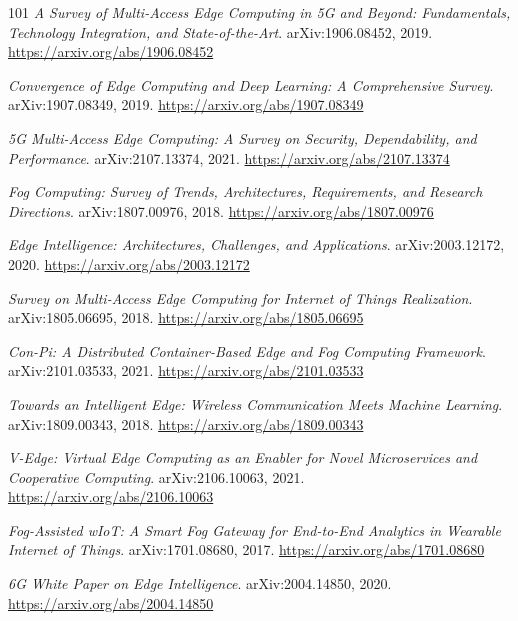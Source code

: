\documentclass[11pt,a4paper]{article}
\begin{document}
\begin{thebibliography}{101}
\newblock \emph{A Survey of Multi-Access Edge Computing in 5G and Beyond: Fundamentals, Technology Integration, and State-of-the-Art}.
\newblock arXiv:1906.08452, 2019.
\newblock \url{https://arxiv.org/abs/1906.08452}

\newblock \emph{Convergence of Edge Computing and Deep Learning: A Comprehensive Survey}.
\newblock arXiv:1907.08349, 2019.
\newblock \url{https://arxiv.org/abs/1907.08349}

\newblock \emph{5G Multi-Access Edge Computing: A Survey on Security, Dependability, and Performance}.
\newblock arXiv:2107.13374, 2021.
\newblock \url{https://arxiv.org/abs/2107.13374}

\newblock \emph{Fog Computing: Survey of Trends, Architectures, Requirements, and Research Directions}.
\newblock arXiv:1807.00976, 2018.
\newblock \url{https://arxiv.org/abs/1807.00976}

\newblock \emph{Edge Intelligence: Architectures, Challenges, and Applications}.
\newblock arXiv:2003.12172, 2020.
\newblock \url{https://arxiv.org/abs/2003.12172}

\newblock \emph{Survey on Multi-Access Edge Computing for Internet of Things Realization}.
\newblock arXiv:1805.06695, 2018.
\newblock \url{https://arxiv.org/abs/1805.06695}

\newblock \emph{Con-Pi: A Distributed Container-Based Edge and Fog Computing Framework}.
\newblock arXiv:2101.03533, 2021.
\newblock \url{https://arxiv.org/abs/2101.03533}

\newblock \emph{Towards an Intelligent Edge: Wireless Communication Meets Machine Learning}.
\newblock arXiv:1809.00343, 2018.
\newblock \url{https://arxiv.org/abs/1809.00343}

\newblock \emph{V-Edge: Virtual Edge Computing as an Enabler for Novel Microservices and Cooperative Computing}.
\newblock arXiv:2106.10063, 2021.
\newblock \url{https://arxiv.org/abs/2106.10063}

\newblock \emph{Fog-Assisted wIoT: A Smart Fog Gateway for End-to-End Analytics in Wearable Internet of Things}.
\newblock arXiv:1701.08680, 2017.
\newblock \url{https://arxiv.org/abs/1701.08680}

\newblock \emph{6G White Paper on Edge Intelligence}.
\newblock arXiv:2004.14850, 2020.
\newblock \url{https://arxiv.org/abs/2004.14850}


\end{thebibliography}
\end{document}
